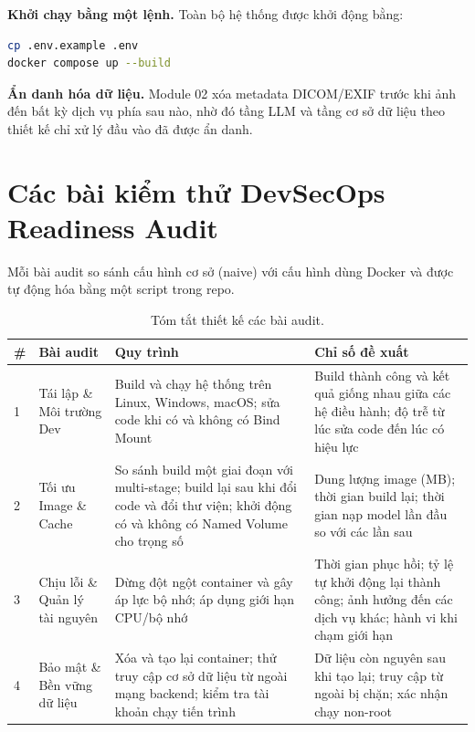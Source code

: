\documentclass[11pt,a4paper]{article}
\begin{document}
\textbf{Khởi chạy bằng một lệnh.} Toàn bộ hệ thống được khởi động bằng:
\begin{lstlisting}[language=bash]
cp .env.example .env
docker compose up --build
\end{lstlisting}

\textbf{Ẩn danh hóa dữ liệu.} Module 02 xóa metadata DICOM/EXIF trước khi ảnh đến bất kỳ dịch vụ phía sau nào, nhờ đó tầng LLM và tầng cơ sở dữ liệu theo thiết kế chỉ xử lý đầu vào đã được ẩn danh.

\section{Các bài kiểm thử DevSecOps Readiness Audit}
Mỗi bài audit so sánh cấu hình cơ sở (naive) với cấu hình dùng Docker và được tự động hóa bằng một script trong repo.

\begin{table}[h]
\centering
\small
\begin{tabularx}{\textwidth}{@{}l p{2.6cm} X X@{}}
\toprule
\textbf{\#} & \textbf{Bài audit} & \textbf{Quy trình} & \textbf{Chỉ số đề xuất} \\
\midrule
1 & Tái lập \& Môi trường Dev & Build và chạy hệ thống trên Linux, Windows, macOS; sửa code khi có và không có Bind Mount & Build thành công và kết quả giống nhau giữa các hệ điều hành; độ trễ từ lúc sửa code đến lúc có hiệu lực \\
2 & Tối ưu Image \& Cache & So sánh build một giai đoạn với multi-stage; build lại sau khi đổi code và đổi thư viện; khởi động có và không có Named Volume cho trọng số & Dung lượng image (MB); thời gian build lại; thời gian nạp model lần đầu so với các lần sau \\
3 & Chịu lỗi \& Quản lý tài nguyên & Dừng đột ngột container và gây áp lực bộ nhớ; áp dụng giới hạn CPU/bộ nhớ & Thời gian phục hồi; tỷ lệ tự khởi động lại thành công; ảnh hưởng đến các dịch vụ khác; hành vi khi chạm giới hạn \\
4 & Bảo mật \& Bền vững dữ liệu & Xóa và tạo lại container; thử truy cập cơ sở dữ liệu từ ngoài mạng backend; kiểm tra tài khoản chạy tiến trình & Dữ liệu còn nguyên sau khi tạo lại; truy cập từ ngoài bị chặn; xác nhận chạy non-root \\
\bottomrule
\end{tabularx}
\caption{Tóm tắt thiết kế các bài audit.}
\end{table}
\end{document}
